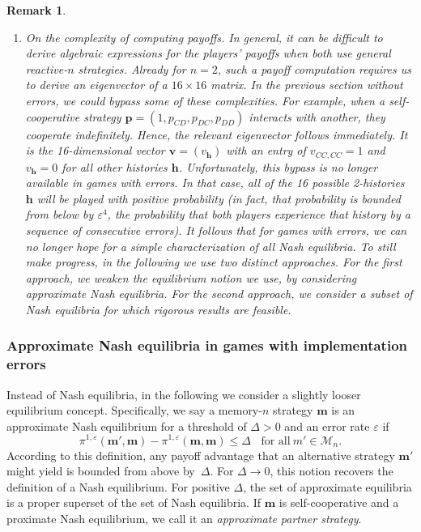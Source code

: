 \documentclass[9pt,twoside,lineno]{pnas-new}
\theoremstyle{plainCl1}
\theoremstyle{plainCl2}
\newtheorem{remark}{Remark}
\begin{document}
\begin{remark}
\begin{enumerate}[label=({\it \roman*})]
\item {\it On the complexity of computing payoffs.} 
In general, it can be difficult to derive algebraic expressions for the players' payoffs when both use general reactive-$n$ strategies. 
Already for $n\!=\!2$, such a payoff computation requires us to derive an eigenvector of a $16\!\times\!16$ matrix.
In the previous section without errors, we could bypass some of these complexities. 
For example, when a self-cooperative strategy $\mathbf{p}=(1,p_{CD},p_{DC}, p_{DD})$ interacts with another, they cooperate indefinitely.
Hence, the relevant eigenvector follows immediately. 
It is the 16-dimensional vector $\mathbf{v}=(v_\mathbf{h})$ with an entry of $v_{CC,CC}\!=\!1$ and $v_\mathbf{h}\!=\!0$ for all other histories $\mathbf{h}$. 
Unfortunately, this bypass is no longer available in games with errors. 
In that case, all of the 16 possible 2-histories $\mathbf{h}$ will be played with positive probability (in fact, that probability is bounded from below by $\varepsilon^4$, the probability that both players experience that history by a sequence of consecutive errors). 
It follows that for games with errors, we can no longer hope for a simple characterization of all Nash equilibria.  
To still make progress, in the following we use two distinct approaches. 
For the first approach, we weaken the equilibrium notion we use, by considering approximate Nash equilibria.  
For the second approach, we consider a subset of Nash equilibria for which rigorous results are feasible. 
\end{enumerate} 
\end{remark}




\subsubsection*{Approximate Nash equilibria in games with implementation errors}

Instead of Nash equilibria, in the following we consider a slightly looser equilibrium concept. 
Specifically, we say a memory-$n$ strategy $\mathbf{m}$ is an approximate Nash equilibrium for a threshold of $\Delta\!>\!0$ and an error rate $\varepsilon$ if 
\begin{equation} \label{Eq:ApproximateNash}
\pi^{1,\varepsilon}(\mathbf{m'},\mathbf{m}) - \pi^{1,\varepsilon}(\mathbf{m},\mathbf{m}) \le \Delta~~~~\text{for all}~m'\in\mathcal{M}_n.
\end{equation}
According to this definition, any payoff advantage that an alternative strategy $\mathbf{m}'$ might yield is bounded from above by~$\Delta$. 
For $\Delta\!\to\!0$, this notion recovers the definition of a Nash equilibrium. 
For positive $\Delta$, the set of approximate equilibria is a proper superset of the set of Nash equilibria. 
If $\mathbf{m}$ is self-cooperative and a proximate Nash equilibrium, we call it an {\it approximate partner strategy}. 
\end{document}

